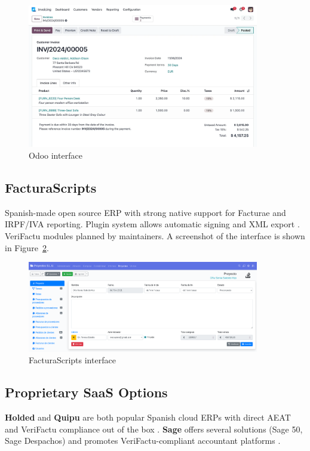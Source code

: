 \begin{figure}[H]
  \centering
  \includegraphics[width=0.9\textwidth]{imaxes/odoo-ui.png}
  \caption{Odoo interface}
  \label{fig:odoo-ui}
\end{figure}

\subsection{FacturaScripts}
Spanish-made open source ERP with strong native support for Facturae and IRPF/IVA reporting. Plugin system allows automatic signing and XML export \cite{FacturaScriptsAntifraude}. VeriFactu modules planned by maintainers. A screenshot of the interface is shown in Figure~\ref{fig:facturascripts-ui}.

\begin{figure}[H]
  \centering
  \includegraphics[width=0.9\textwidth]{imaxes/facturascripts-ui.png}
  \caption{FacturaScripts interface}
  \label{fig:facturascripts-ui}
\end{figure}

\subsection{Proprietary SaaS Options}
\textbf{Holded} and \textbf{Quipu} are both popular Spanish cloud ERPs with direct AEAT and VeriFactu compliance out of the box \cite{HoldedVerifactu, QuipuVerifactu}. \textbf{Sage} offers several solutions (Sage 50, Sage Despachos) and promotes VeriFactu-compliant accountant platforms \cite{SageVerifactu, SageBlogAsesoria}.

